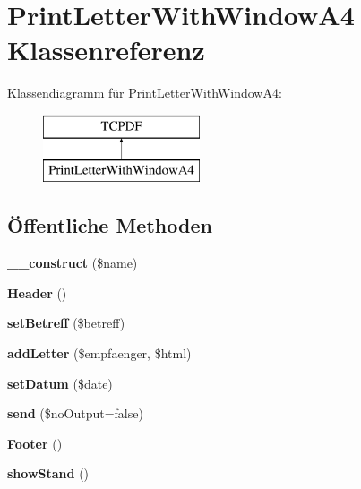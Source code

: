 \hypertarget{class_print_letter_with_window_a4}{}\section{Print\+Letter\+With\+Window\+A4 Klassenreferenz}
\label{class_print_letter_with_window_a4}
Klassendiagramm für Print\+Letter\+With\+Window\+A4\+:\begin{figure}[H]
\begin{center}
\leavevmode
\includegraphics[height=2.000000cm]{class_print_letter_with_window_a4}
\end{center}
\end{figure}
\subsection*{Öffentliche Methoden}
\begin{DoxyCompactItemize}
\item 
\mbox{\label{class_print_letter_with_window_a4_a103dcd7d76b3886f3aac6f7edd227083}} 
{\bfseries \+\_\+\+\_\+construct} (\$name)
\item 
\mbox{\label{class_print_letter_with_window_a4_a9cab7e766bf1d65cb1186007cfe5197a}} 
{\bfseries Header} ()
\item 
\mbox{\label{class_print_letter_with_window_a4_a153923cbd00585fb727705b5665981d2}} 
{\bfseries set\+Betreff} (\$betreff)
\item 
\mbox{\label{class_print_letter_with_window_a4_a085a933a2b6293b708f9f040f79eeb13}} 
{\bfseries add\+Letter} (\$empfaenger, \$html)
\item 
\mbox{\label{class_print_letter_with_window_a4_ab5160b85de44dd74f3e39778b124a97d}} 
{\bfseries set\+Datum} (\$date)
\item 
\mbox{\label{class_print_letter_with_window_a4_a1508fa56863ad11593324ad4786b731b}} 
{\bfseries send} (\$no\+Output=false)
\item 
\mbox{\label{class_print_letter_with_window_a4_a05b36bafca03745f4cbd171264d201d5}} 
{\bfseries Footer} ()
\item 
\mbox{\label{class_print_letter_with_window_a4_ae9991d1f16c36e5774c61f537cf8feaf}} 
{\bfseries show\+Stand} ()
\end{DoxyCompactItemize}


